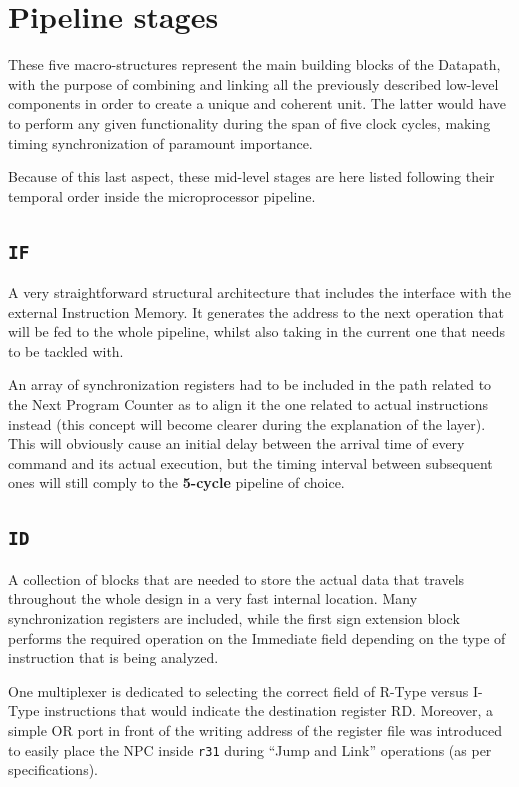 \section{Pipeline stages}
These five macro-structures represent the main building blocks of the Datapath, with the purpose of combining and linking all the previously described low-level components in order to create a unique and coherent unit. The latter would have to perform any given functionality during the span of five clock cycles, making timing synchronization of paramount importance.

Because of this last aspect, these mid-level stages are here listed following their temporal order inside the microprocessor pipeline.
\subsection{\texttt{IF}}
A very straightforward structural architecture that includes the interface with the external Instruction Memory. It generates the address to the next operation that will be fed to the whole pipeline, whilst also taking in the current one that needs to be tackled with.

An array of synchronization registers had to be included in the path related to the Next Program Counter as to align it the one related to actual instructions instead (this concept will become clearer during the explanation of the  layer). This will obviously cause an initial delay between the arrival time of every command and its actual execution, but the timing interval between subsequent ones will still comply to the \textbf{5-cycle} pipeline of choice.

\subsection{\texttt{ID}}
A collection of blocks that are needed to store the actual data that travels throughout the whole design in a very fast internal location. Many synchronization registers are included, while the first sign extension block performs the required operation on the Immediate field depending on the type of instruction that is being analyzed.

One multiplexer is dedicated to selecting the correct field of R-Type versus I-Type instructions that would indicate the destination register RD. Moreover, a simple OR port in front of the writing address of the register file was introduced to easily place the NPC inside \texttt{r31} during ``Jump and Link'' operations (as per specifications).


